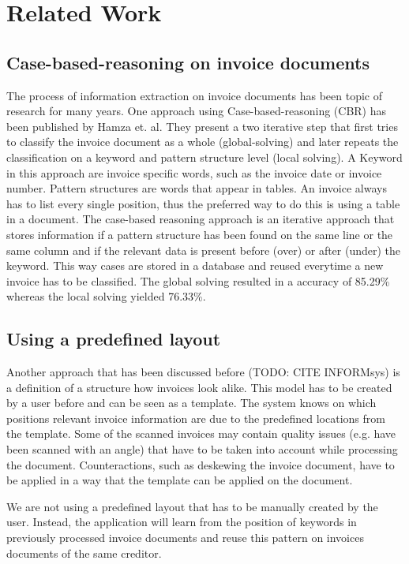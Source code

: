 \section{Related Work}
\label{sec1.4}

\subsection{Case-based-reasoning on invoice documents}
The process of information extraction on invoice documents has been topic of research for many years. One approach using Case-based-reasoning (CBR) has been published by Hamza et. al. They present a two iterative step that first tries to classify the invoice document as a whole (global-solving) and later repeats the classification on a keyword and pattern structure level (local solving). A Keyword in this approach are invoice specific words, such as the invoice date or invoice number. Pattern structures are words that appear in tables. An invoice always has to list every single position, thus the preferred way to do this is using a table in a document.
The case-based reasoning approach is an iterative approach that stores information if a pattern structure has been found on the same line or the same column and if the relevant data is present before (over) or after (under) the keyword. This way cases are stored in a database and reused everytime a new invoice has to be classified. The global solving resulted in a accuracy of 85.29\% whereas the local solving yielded 76.33\%.
\subsection{Using a predefined layout}
Another approach that has been discussed before (TODO: CITE INFORMsys) is a definition of a structure how invoices look alike. This model has to be created by a user before and can be seen as a template. The system knows on which positions relevant invoice information are due to the predefined locations from the template.
Some of the scanned invoices may contain quality issues (e.g. have been scanned with an angle) that have to be taken into account while processing the document. Counteractions, such as deskewing the invoice document, have to be applied in a way that the template can be applied on the document.

We are not using a predefined layout that has to be manually created by the user. Instead, the application will learn from the position of keywords in previously processed invoice documents and reuse this pattern on invoices documents of the same creditor.

